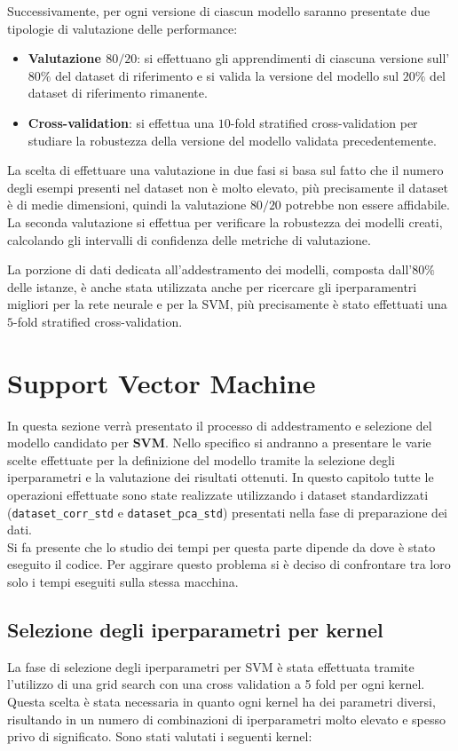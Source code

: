 Successivamente, per ogni versione di ciascun modello saranno presentate due
tipologie di valutazione delle performance:
\begin{itemize}
    \item \textbf{Valutazione $80/20$}: si effettuano gli apprendimenti di
          ciascuna versione sull'$80\%$ del dataset di riferimento e si valida
          la versione del modello sul $20\%$ del dataset di riferimento rimanente.
    \item \textbf{Cross-validation}: si effettua una $10$-fold stratified
          cross-validation per studiare la robustezza della versione del modello
          validata precedentemente.
\end{itemize}
La scelta di effettuare una valutazione in due fasi si basa sul fatto che il
numero degli esempi presenti nel dataset non è molto elevato, più precisamente
il dataset è di medie dimensioni, quindi la valutazione $80/20$ potrebbe non
essere affidabile. La seconda valutazione si effettua per verificare la
robustezza dei modelli creati, calcolando gli intervalli di confidenza delle
metriche di valutazione.

La porzione di dati dedicata all'addestramento dei modelli, composta dall'$80\%$
delle istanze, è anche stata utilizzata anche per ricercare gli iperparamentri 
migliori per la rete neurale e per la SVM, più precisamente è stato effettuati 
una $5$-fold stratified cross-validation.

\section{Support Vector Machine}
In questa sezione verrà presentato il processo di addestramento e selezione del modello
candidato per \textbf{SVM}. Nello specifico si andranno a presentare le varie scelte
effettuate per la definizione del modello tramite la selezione degli iperparametri e 
la valutazione dei risultati ottenuti.
In questo capitolo tutte le operazioni effettuate sono state realizzate 
utilizzando i dataset standardizzati (\texttt{dataset\_corr\_std} e 
\texttt{dataset\_pca\_std}) presentati nella fase di preparazione dei 
dati.\\
Si fa presente che lo studio dei tempi per questa parte dipende da dove è stato
eseguito il codice. Per aggirare questo problema si è deciso di confrontare tra 
loro solo i tempi eseguiti sulla stessa macchina.

\subsection{Selezione degli iperparametri per kernel}
La fase di selezione degli iperparametri per SVM è stata effettuata tramite 
l'utilizzo di una grid search con una cross validation a 5 fold per ogni kernel.
Questa scelta è stata necessaria in quanto ogni kernel ha dei parametri diversi,
risultando in un numero di combinazioni di iperparametri molto elevato e spesso 
privo di significato.
Sono stati valutati i seguenti kernel:

